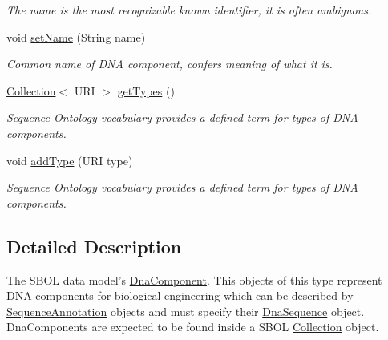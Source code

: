 \begin{DoxyCompactItemize}
\begin{DoxyCompactList}\small\item\em The name is the most recognizable known identifier, it is often ambiguous. \item\end{DoxyCompactList}\item 
void \hyperlink{interfaceorg_1_1sbolstandard_1_1core_1_1_dna_component_ad737b36b74be994e0d8420797ed72f78}{setName} (String name)
\begin{DoxyCompactList}\small\item\em Common name of DNA component, confers meaning of what it is. \item\end{DoxyCompactList}\item 
\hyperlink{interfaceorg_1_1sbolstandard_1_1core_1_1_collection}{Collection}$<$ URI $>$ \hyperlink{interfaceorg_1_1sbolstandard_1_1core_1_1_dna_component_a518b97368db3de477d5fb57150d8b711}{getTypes} ()
\begin{DoxyCompactList}\small\item\em Sequence Ontology vocabulary provides a defined term for types of DNA components. \item\end{DoxyCompactList}\item 
void \hyperlink{interfaceorg_1_1sbolstandard_1_1core_1_1_dna_component_a26d3aea2567e9235daef5a79a5e6a521}{addType} (URI type)
\begin{DoxyCompactList}\small\item\em Sequence Ontology vocabulary provides a defined term for types of DNA components. \item\end{DoxyCompactList}\end{DoxyCompactItemize}


\subsection{Detailed Description}
The SBOL data model's \hyperlink{interfaceorg_1_1sbolstandard_1_1core_1_1_dna_component}{DnaComponent}. This objects of this type represent DNA components for biological engineering which can be described by \hyperlink{interfaceorg_1_1sbolstandard_1_1core_1_1_sequence_annotation}{SequenceAnnotation} objects and must specify their \hyperlink{interfaceorg_1_1sbolstandard_1_1core_1_1_dna_sequence}{DnaSequence} object. DnaComponents are expected to be found inside a SBOL \hyperlink{interfaceorg_1_1sbolstandard_1_1core_1_1_collection}{Collection} object. 

